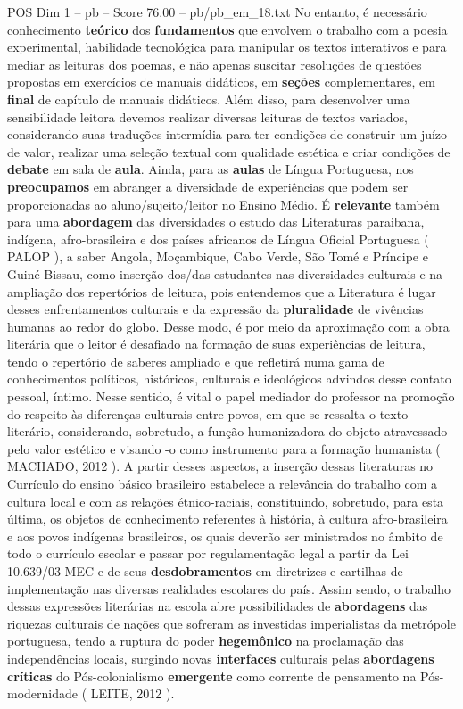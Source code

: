 \begin{textsample}{POS Dim 1 – pb – Score 76.00 – pb/pb\_em\_18.txt}
No entanto, é necessário conhecimento \textbf{teórico} dos \textbf{fundamentos} que envolvem o trabalho com a poesia experimental, habilidade tecnológica para manipular os textos interativos e para mediar as leituras dos poemas, e não apenas suscitar resoluções de questões propostas em exercícios de manuais didáticos, em \textbf{seções} complementares, em \textbf{final} de capítulo de manuais didáticos.
Além disso, para desenvolver uma sensibilidade leitora devemos realizar diversas leituras de textos variados, considerando suas traduções intermídia para ter condições de construir um juízo de valor, realizar uma seleção textual com qualidade estética e criar condições de \textbf{debate} em sala de \textbf{aula}.
Ainda, para as \textbf{aulas} de Língua Portuguesa, nos \textbf{preocupamos} em abranger a diversidade de experiências que podem ser proporcionadas ao aluno/sujeito/leitor no Ensino Médio.
É \textbf{relevante} também para uma \textbf{abordagem} das diversidades o estudo das Literaturas paraibana, indígena, afro-brasileira e dos países africanos de Língua Oficial Portuguesa ( PALOP ), a saber Angola, Moçambique, Cabo Verde, São Tomé e Príncipe e Guiné-Bissau, como inserção dos/das estudantes nas diversidades culturais e na ampliação dos repertórios de leitura, pois entendemos que a Literatura é lugar desses enfrentamentos culturais e da expressão da \textbf{pluralidade} de vivências humanas ao redor do globo.
Desse modo, é por meio da aproximação com a obra literária que o leitor é desafiado na formação de suas experiências de leitura, tendo o repertório de saberes ampliado e que refletirá numa gama de conhecimentos políticos, históricos, culturais e ideológicos advindos desse contato pessoal, íntimo.
Nesse sentido, é vital o papel mediador do professor na promoção do respeito às diferenças culturais entre povos, em que se ressalta o texto literário, considerando, sobretudo, a função humanizadora do objeto atravessado pelo valor estético e visando -o como instrumento para a formação humanista ( MACHADO, 2012 ).
A partir desses aspectos, a inserção dessas literaturas no Currículo do ensino básico brasileiro estabelece a relevância do trabalho com a cultura local e com as relações étnico-raciais, constituindo, sobretudo, para esta última, os objetos de conhecimento referentes à história, à cultura afro-brasileira e aos povos indígenas brasileiros, os quais deverão ser ministrados no âmbito de todo o currículo escolar e passar por regulamentação legal a partir da Lei 10.639/03-MEC e de seus \textbf{desdobramentos} em diretrizes e cartilhas de implementação nas diversas realidades escolares do país.
Assim sendo, o trabalho dessas expressões literárias na escola abre possibilidades de \textbf{abordagens} das riquezas culturais de nações que sofreram as investidas imperialistas da metrópole portuguesa, tendo a ruptura do poder \textbf{hegemônico} na proclamação das independências locais, surgindo novas \textbf{interfaces} culturais pelas \textbf{abordagens} \textbf{críticas} do Pós-colonialismo \textbf{emergente} como corrente de pensamento na Pós-modernidade ( LEITE, 2012 ).


\end{textsample}
